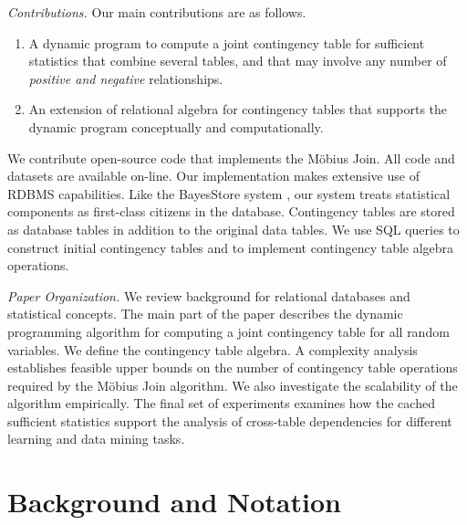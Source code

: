 \documentclass{acm_proc_article-sp}
\begin{document}
\emph{Contributions.} Our main contributions are as follows.
\begin{enumerate}
\item A dynamic program to compute a joint contingency table for sufficient statistics that combine several tables, and that may involve any number of {\em positive and negative }relationships.
\item An extension of relational algebra for contingency tables that supports the dynamic program conceptually and computationally.
\end{enumerate}

We contribute open-source code that implements the M\"obius Join. All code and datasets are available on-line\cite{bib:jbnsite}. Our implementation makes extensive use of RDBMS capabilities. Like the BayesStore system \cite{Wang2008}, our system treats statistical components as first-class citizens in the database. Contingency tables are stored as database tables  in addition to the original data tables. We use SQL queries to construct initial contingency tables and to implement contingency table algebra operations. 

\emph{Paper Organization.} 
We review background for relational databases and statistical concepts. 
The main part of the paper describes the dynamic programming algorithm for computing a joint contingency table for all random variables. 
We define the contingency table algebra. 
A complexity analysis establishes feasible upper bounds on the number of contingency table operations required by the M\"obius Join algorithm. 
We also investigate the scalability of the algorithm empirically. 
The final set of experiments examines how the cached sufficient statistics support the analysis of cross-table dependencies for different learning and data mining tasks.

 
\section{Background and Notation}
\end{document}
